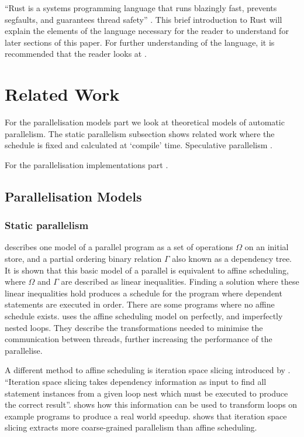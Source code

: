\documentclass[conference]{IEEEtran}
\begin{document}
``Rust is a systems programming language that runs blazingly fast, prevents segfaults, and guarantees thread safety'' \parencite{rustlang}. This brief introduction to Rust will explain the elements of the language necessary for the reader to understand for later sections of this paper. For further understanding of the language, it is recommended that the reader looks at \textcite{rustbook}.


\section{Related Work}
\label{sec:related-work}

For the parallelisation models part we look at theoretical models of automatic parallelism. The static parallelism subsection shows related work where the schedule is fixed and calculated at `compile' time. Speculative parallelism .

For the parallelisation implementations part .

\subsection{Parallelisation Models}
\subsubsection{Static parallelism}
\textcite{Feautrier1992,Feautrier1992a} describes one model of a parallel program as a set of operations $\Omega$ on an initial store, and a partial ordering binary relation $\Gamma$ also known as a dependency tree. It is shown that this basic model of a parallel is equivalent to affine scheduling, where $\Omega$ and $\Gamma$ are described as linear inequalities. Finding a solution where these linear inequalities hold produces a schedule for the program where dependent statements are executed in order. There are some programs where no affine schedule exists.
\textcite{Bondhugula2008} uses the affine scheduling model on perfectly, and imperfectly nested loops. They describe the transformations needed to minimise the communication between threads, further increasing the performance of the parallelise.

A different method to affine scheduling is iteration space slicing introduced by \textcite{Pugh1997}. ``Iteration space slicing takes dependency information as input to find all statement instances from a given loop nest which must be executed to produce the correct result''. \textcite{Pugh1997} shows how this information can be used to transform loops on example programs to produce a real world speedup. \textcite{Beletska2011} shows that iteration space slicing extracts more coarse-grained parallelism than affine scheduling.
\end{document}
